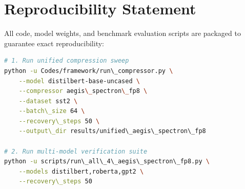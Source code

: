 \section{Reproducibility Statement}
All code, model weights, and benchmark evaluation scripts are packaged to guarantee exact reproducibility:
\begin{lstlisting}[language=bash]
# 1. Run unified compression sweep
python -u Codes/framework/run\_compressor.py \
    --model distilbert-base-uncased \
    --compressor aegis\_spectron\_fp8 \
    --dataset sst2 \
    --batch\_size 64 \
    --recovery\_steps 50 \
    --output\_dir results/unified\_aegis\_spectron\_fp8

# 2. Run multi-model verification suite
python -u scripts/run\_all\_4\_aegis\_spectron\_fp8.py \
    --models distilbert,roberta,gpt2 \
    --recovery\_steps 50
\end{lstlisting}
